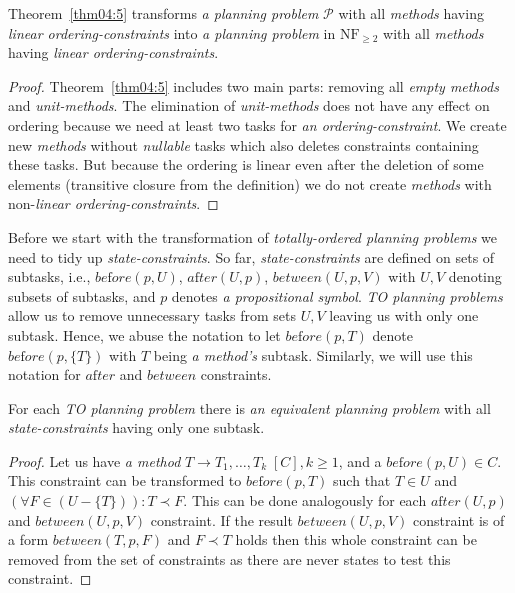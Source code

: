 \begin{thm}\label{thm04:7}
    Theorem~\ref{thm04:5} transforms \emph{a planning problem} $\mathcal{P}$ with all \emph{methods} having \emph{linear ordering-constraints} into \emph{a planning problem} in $\text{NF}_{\geq 2}$ with all \emph{methods} having \emph{linear ordering-constraints}.
\end{thm}
\begin{proof}
    Theorem~\ref{thm04:5} includes two main parts: removing all \emph{empty methods} and \emph{unit-methods}. The elimination of \emph{unit-methods} does not have any effect on ordering because we need at least two tasks for \emph{an ordering-constraint}. We create new \emph{methods} without \emph{nullable} tasks which also deletes constraints containing these tasks. But because the ordering is linear even after the deletion of some elements (transitive closure from the definition) we do not create \emph{methods} with non-\emph{linear ordering-constraints}.
\end{proof}

\medskip\noindent
Before we start with the transformation of \emph{totally-ordered planning problems} we need to tidy up \emph{state-constraints}. So far, \emph{state-constraints} are defined on sets of subtasks, i.e., $be\text{f}ore(p, U)$, $a\text{f}ter(U, p)$, $between(U, p, V)$ with $U, V$ denoting subsets of subtasks, and $p$ denotes \emph{a propositional symbol}. \emph{TO planning problems} allow us to remove unnecessary tasks from sets $U, V$ leaving us with only one subtask. Hence, we abuse the notation to let $be\text{f}ore(p, T)$ denote $be\text{f}ore(p, \{ T \})$ with $T$ being \emph{a method's} subtask. Similarly, we will use this notation for $a\text{f}ter$ and $between$ constraints. 

\begin{thm}\label{thm04:8}
    For each \emph{TO planning problem} there is \emph{an equivalent planning problem} with all \emph{state-constraints} having only one subtask.
\end{thm}
\begin{proof}
    Let us have \emph{a method} $T \rightarrow T_1, \dots, T_k \; [C], k \geq 1$, and a $be\text{f}ore(p, U) \in C$. This constraint can be transformed to $be\text{f}ore(p, T)$ such that $T \in U$ and $(\forall F \in (U - \{ T \})): T \prec F$. This can be done analogously for each $a\text{f}ter(U, p)$ and $between(U, p, V)$ constraint. If the result $between(U, p, V)$ constraint is of a form $between(T, p, F)$ and $F \prec T$ holds then this whole constraint can be removed from the set of constraints as there are never states to test this constraint. 
\end{proof}


